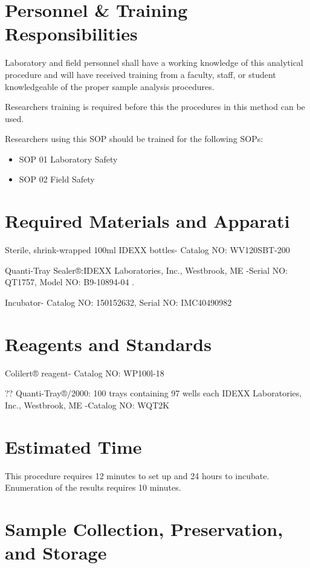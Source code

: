 \documentclass[12pt]{../SOP4_alpha}\usepackage[]{graphicx}\usepackage[]{xcolor}
\begin{document}
\section{Personnel \& Training Responsibilities}

\NP Laboratory and field personnel shall have a working knowledge of this analytical procedure and will have received training from a faculty, staff, or student knowledgeable of the proper sample analysis procedures. 

\NP Researchers training is required before this the procedures in this method can be used.

\NP Researchers using this SOP should be trained for the following SOPs:

\begin{itemize}
  \item SOP 01 Laboratory Safety
  \item SOP 02 Field Safety
\end{itemize}

\section{Required Materials and Apparati}

 Sterile, shrink-wrapped 100ml IDEXX bottles- Catalog NO: WV120SBT-200

\NP Quanti-Tray Sealer®:IDEXX Laboratories, Inc., Westbrook, ME -Serial NO: QT1757, Model NO: B9-10894-04
.

\NP Incubator- Catalog NO: 150152632, Serial NO: IMC40490982


\section{Reagents and Standards}

\NP Colilert® reagent- Catalog NO: WP100l-18

\NP ?? Quanti-Tray®/2000: 100 trays containing 97 wells each IDEXX Laboratories, Inc., Westbrook, ME -Catalog NO: WQT2K

\section{Estimated Time}

\NP This procedure requires 12 minutes to set up and 24 hours to incubate. Enumeration of the results requires 10 minutes.

\section{Sample Collection, Preservation, and Storage}
\end{document}
